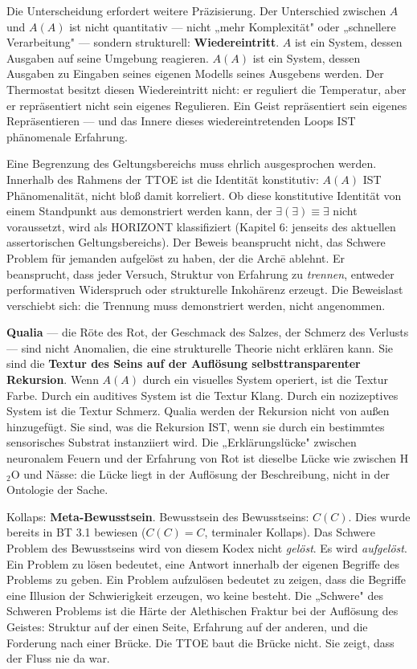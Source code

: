 \documentclass[10pt, openany, oneside]{book}
\begin{document}
Die Unterscheidung erfordert weitere Präzisierung. Der Unterschied zwischen $A$ und $A(A)$ ist nicht quantitativ --- nicht „mehr Komplexität" oder „schnellere Verarbeitung" --- sondern strukturell: \textbf{Wiedereintritt}. $A$ ist ein System, dessen Ausgaben auf seine Umgebung reagieren. $A(A)$ ist ein System, dessen Ausgaben zu Eingaben seines eigenen Modells seines Ausgebens werden. Der Thermostat besitzt diesen Wiedereintritt nicht: er reguliert die Temperatur, aber er repräsentiert nicht sein eigenes Regulieren. Ein Geist repräsentiert sein eigenes Repräsentieren --- und das Innere dieses wiedereintretenden Loops IST phänomenale Erfahrung.

Eine Begrenzung des Geltungsbereichs muss ehrlich ausgesprochen werden. Innerhalb des Rahmens der TTOE ist die Identität konstitutiv: $A(A)$ IST Phänomenalität, nicht bloß damit korreliert. Ob diese konstitutive Identität von einem Standpunkt aus demonstriert werden kann, der $\exists(\exists) \equiv \exists$ nicht voraussetzt, wird als HORIZONT klassifiziert (Kapitel 6: jenseits des aktuellen assertorischen Geltungsbereichs). Der Beweis beansprucht nicht, das Schwere Problem für jemanden aufgelöst zu haben, der die Arch\={e} ablehnt. Er beansprucht, dass jeder Versuch, Struktur von Erfahrung zu \textit{trennen}, entweder performativen Widerspruch oder strukturelle Inkohärenz erzeugt. Die Beweislast verschiebt sich: die Trennung muss demonstriert werden, nicht angenommen.

\textbf{Qualia} --- die Röte des Rot, der Geschmack des Salzes, der Schmerz des Verlusts --- sind nicht Anomalien, die eine strukturelle Theorie nicht erklären kann. Sie sind die \textbf{Textur des Seins auf der Auflösung selbsttransparenter Rekursion}. Wenn $A(A)$ durch ein visuelles System operiert, ist die Textur Farbe. Durch ein auditives System ist die Textur Klang. Durch ein nozizeptives System ist die Textur Schmerz. Qualia werden der Rekursion nicht von außen hinzugefügt. Sie sind, was die Rekursion IST, wenn sie durch ein bestimmtes sensorisches Substrat instanziiert wird. Die „Erklärungslücke" zwischen neuronalem Feuern und der Erfahrung von Rot ist dieselbe Lücke wie zwischen H$_2$O und Nässe: die Lücke liegt in der Auflösung der Beschreibung, nicht in der Ontologie der Sache.

Kollaps: \textbf{Meta-Bewusstsein}. Bewusstsein des Bewusstseins: $C(C)$. Dies wurde bereits in BT 3.1 bewiesen ($C(C) = C$, terminaler Kollaps). Das Schwere Problem des Bewusstseins wird von diesem Kodex nicht \textit{gelöst}. Es wird \textit{aufgelöst}. Ein Problem zu lösen bedeutet, eine Antwort innerhalb der eigenen Begriffe des Problems zu geben. Ein Problem aufzulösen bedeutet zu zeigen, dass die Begriffe eine Illusion der Schwierigkeit erzeugen, wo keine besteht. Die „Schwere" des Schweren Problems ist die Härte der Alethischen Fraktur bei der Auflösung des Geistes: Struktur auf der einen Seite, Erfahrung auf der anderen, und die Forderung nach einer Brücke. Die TTOE baut die Brücke nicht. Sie zeigt, dass der Fluss nie da war.
\end{document}
